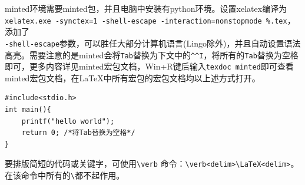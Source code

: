 minted环境需要minted包，并且电脑中安装有python环境。设置xelatex编译为\\\verb|xelatex.exe -synctex=1 -shell-escape -interaction=nonstopmode %.tex|，添加了\\\verb|-shell-escape|参数，可以胜任大部分计算机语言(Lingo除外)，并且自动设置语法高亮。需要注意的是minted会将\verb|Tab|替换为下文中的\verb|^^I|，将所有的\verb|Tab|替换为空格即可，更多内容详见minted宏包文档，Win+R键后输入\verb|texdoc minted|即可查看minted宏包文档，在\LaTeX 中所有宏包的宏包文档均以上述方式打开。
\begin{verbatim}
#include<stdio.h>
int main(){
	printf("hello world");
    return 0; /*将Tab替换为空格*/
}
\end{verbatim}

要排版简短的代码或关键字，可使用\verb|\verb| 命令：\verb|\verb<delim>\LaTeX<delim>|。
在该命令中所有的\verb|\|都不起作用。